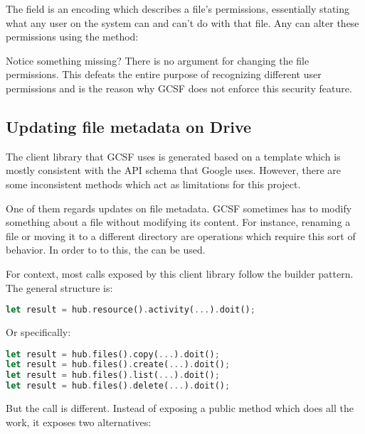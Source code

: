 

The  field is an encoding which describes a file's permissions, essentially stating what any user on the system can and can't do with that file. Any  can alter these permissions using the  method:




Notice something missing? There is no argument for changing the file permissions. This defeats the entire purpose of recognizing different user permissions and is the reason why GCSF does not enforce this security feature.

\subsection{Updating file metadata on Drive} \label{updating_metadata}

The client library that GCSF uses is generated based on a template which is mostly consistent with the API schema that Google uses. However, there are some inconsistent methods which act as limitations for this project.

One of them regards updates on file metadata. GCSF sometimes has to modify something about a file without modifying its content. For instance, renaming a file or moving it to a different directory are operations which require this sort of behavior. In order to to this, the  can be used.

For context, most calls exposed by this client library follow the builder pattern\cite{gof}. The general structure is:

\begin{lstlisting}[language=Rust, caption=Setting file attributes, frame=single]
let result = hub.resource().activity(...).doit();
\end{lstlisting}

Or specifically:

\begin{lstlisting}[language=Rust, caption=Setting file attributes, frame=single]
let result = hub.files().copy(...).doit();
let result = hub.files().create(...).doit();
let result = hub.files().list(...).doit();
let result = hub.files().delete(...).doit();
\end{lstlisting}

But the  call is different. Instead of exposing a public  method which does all the work, it exposes two alternatives:

